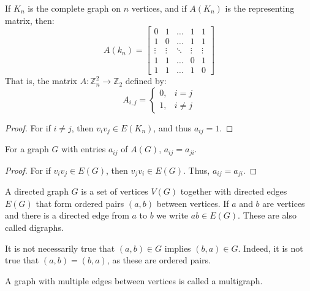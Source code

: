        \begin{theorem}
            If $K_{n}$ is the complete graph on $n$ vertices, and if $A(K_n)$ is
            the representing matrix, then:
            \begin{equation}
                A(k_{n})=
                \begin{bmatrix}
                    0&1&\hdots&1&1\\
                    1&0&\hdots&1&1\\
                    \vdots&\vdots&\ddots&\vdots&\vdots\\
                    1&1&\dots&0&1\\
                    1&1&\hdots&1&0
                \end{bmatrix}
            \end{equation}
            That is, the matrix $A:\mathbb{Z}_{n}^{2}\rightarrow\mathbb{Z}_{2}$
            defined by:
            \begin{equation}
                A_{i,j}=
                \begin{cases}
                    0,&i=j\\
                    1,&i\ne{j}
                \end{cases}
            \end{equation}
        \end{theorem}
        \begin{proof}
        For if $i\ne j$, then $v_iv_j \in E(K_n)$, and thus $a_{ij}=1$.
        \end{proof}
        \begin{theorem}
        For a graph $G$ with entries $a_{ij}$ of $A(G)$, $a_{ij} = a_{ji}$.
        \end{theorem}
        \begin{proof}
        For if $v_iv_j \in E(G)$, then $v_j v_i \in E(G)$. Thus, $a_{ij} = a_{ji}$.
        \end{proof}
        \begin{definition}
        A directed graph $G$ is a set of vertices $V(G)$ together with directed edges $E(G)$ that form ordered pairs $(a,b)$ between vertices. If $a$ and $b$ are vertices and there is a directed edge from $a$ to $b$ we write $ab \in E(G)$. These are also called digraphs.
        \end{definition}
        It is not necessarily true that $(a,b) \in G$ implies $(b,a) \in G$.
        Indeed, it is not true that $(a,b) = (b,a)$, as these are ordered pairs.
        \begin{definition}
        A graph with multiple edges between vertices is called a multigraph.
        \end{definition}
